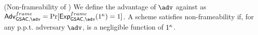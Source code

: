 \begin{definition}{(Non-frameability of \GSAC)}
  \label{def:frame-gsac}
  We define the advantage \AdvGSACNonframe of $\adv$ against \ExpGSACNonframe as
  $\AdvGSACNonframe=\Pr\lbrack\ExpGSACNonframe(1^\secpar)=1\rbrack$.
  A \GSAC scheme satisfies non-frameability if, for any p.p.t. adversary $\adv$,
  \AdvNonframe is a negligible function of $1^\kappa$.
\end{definition}

